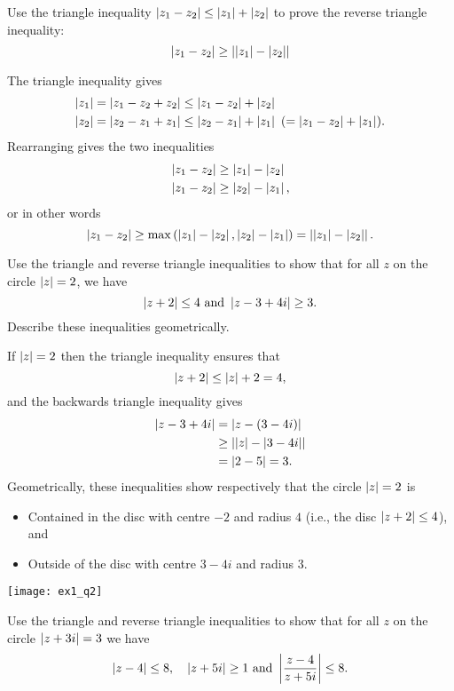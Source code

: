 

\begin{questions}
\question Use the triangle inequality $\left| z_1-z_2 \right| \leq \left| z_1 \right| + \left| z_2 \right|$ to prove the reverse triangle inequality:
\[
\left| z_1-z_2 \right| \geq \left| \left| z_1 \right|-\left| z_2 \right| \right|
\]
\begin{answer}
The triangle inequality gives
\begin{align*}
\abs{z_1} & = \abs{z_1-z_2+z_2} \leq \abs{z_1-z_2} + \abs{z_2}  \\
\abs{z_2} & = \abs{z_2-z_1+z_1} \leq \abs{z_2-z_1} + \abs{z_1}\ (=\abs{z_1-z_2}+\abs{z_1}).
\end{align*}
Rearranging gives the two inequalities
\begin{align*}
\left| z_1-z_2 \right| & \geq \left| z_1 \right| - \left| z_2 \right| \\
\left| z_1-z_2 \right| & \geq \left| z_2 \right| - \left| z_1 \right|,
\end{align*}
or in other words
\[
\left| z_1-z_2 \right| \geq \max \left( \left| z_1 \right|-\left| z_2 \right| , \left| z_2 \right| - \left| z_1 \right| \right) = \left| \left| z_1 \right| - \left| z_2 \right|  \right|.
\]
\end{answer}
\question Use the triangle and reverse triangle inequalities to show that for all $z$ on the circle $\left| z \right|=2$, we have
\[
\left| z+2 \right| \leq 4 \text{ and } \left| z-3+4i \right| \geq 3.
\]
Describe these inequalities geometrically.
\begin{answer}
If $\left| z \right|=2$ then the triangle inequality ensures that
\[
\left| z+2 \right| \leq \left| z \right|+2 = 4,
\]
and the backwards triangle inequality gives
\begin{align*}
\left| z-3+4i \right| & = \left| z-(3-4i) \right| \\
& \geq \left|  \left| z \right| - \left| 3-4i \right|  \right| \\
& = \left| 2-5 \right| = 3.
\end{align*}
Geometrically, these inequalities show respectively that the circle $\left| z \right|=2$ is
\begin{itemize}
\item Contained in the disc with centre $-2$ and radius $4$ (i.e., the disc $\left| z+2 \right| \leq 4$), and
\item Outside of the disc with centre $3-4i$ and radius $3$.
\end{itemize}
\begin{center}
\texttt{[image: ex1\_q2]}
\end{center}
\end{answer}
\question Use the triangle and reverse triangle inequalities to show that for all $z$ on the circle $\left| z+3i \right|=3$ we have
\[
\left| z-4 \right| \leq 8,\quad \left| z+5i \right|\geq 1 \text{ and } \left|  \frac{z-4}{z+5i}  \right| \leq 8.
\]
\begin{answer}


\end{answer}
\end{questions}
